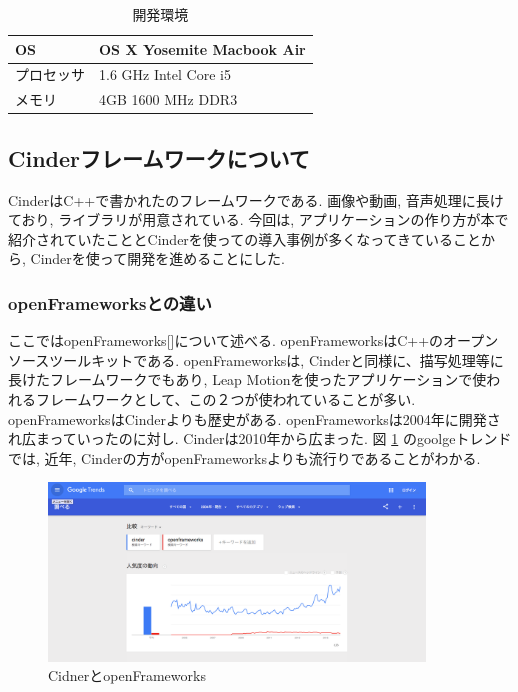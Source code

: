 \documentclass{funthesis}
\begin{document}
\begin{table}[H]
\begin{center}
\caption{開発環境}
  \begin{tabular}{ll}
  
   \hline
OS & OS X  Yosemite Macbook Air \\ 
  \hline
プロセッサ & 1.6 GHz Intel Core i5\\ 
  \hline
メモリ & 4GB 1600 MHz DDR3\\ 
  \hline
  \end{tabular}
  \label{env}
  \end{center}
\end{table}


\subsection{Cinderフレームワークについて}
CinderはC++で書かれたのフレームワークである. 画像や動画, 音声処理に長けており, ライブラリが用意されている. 今回は, アプリケーションの作り方が本で紹介されていたこととCinderを使っての導入事例が多くなってきていることから, Cinderを使って開発を進めることにした. 



\subsubsection{openFrameworksとの違い}
ここではopenFrameworks[]について述べる. openFrameworksはC++のオープンソースツールキットである. openFrameworksは, Cinderと同様に、描写処理等に長けたフレームワークでもあり, Leap Motionを使ったアプリケーションで使われるフレームワークとして、この２つが使われていることが多い. 
openFrameworksはCinderよりも歴史がある. openFrameworksは2004年に開発され広まっていったのに対し. Cinderは2010年から広まった. 図 \ref{API} のgoolgeトレンドでは, 近年, Cinderの方がopenFrameworksよりも流行りであることがわかる. 

\begin{figure}[H]
 \begin{center}
  \includegraphics[width=100mm]{./img/api.png}
 \end{center}
 \caption{CidnerとopenFrameworks}
 \label{API}
\end{figure}
\end{document}
